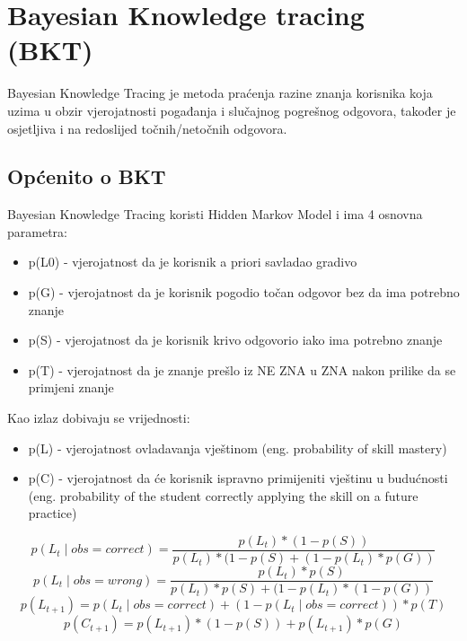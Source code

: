 \chapter{Bayesian Knowledge tracing (BKT)}
\label{ch:BKT}
Bayesian Knowledge Tracing je metoda praćenja razine znanja korisnika koja uzima u obzir vjerojatnosti pogađanja i slučajnog pogrešnog odgovora, također je osjetljiva i na redoslijed točnih/netočnih odgovora.
\section{Općenito o BKT}
Bayesian Knowledge Tracing koristi Hidden Markov Model i ima 4 osnovna parametra:
\begin{itemize}
	\item p(L0) - vjerojatnost da je korisnik a priori savladao gradivo
	\item p(G) - vjerojatnost da je korisnik pogodio točan odgovor bez da ima potrebno znanje	
	\item p(S) - vjerojatnost da je korisnik krivo odgovorio iako ima potrebno znanje	
	\item p(T) - vjerojatnost da je znanje prešlo iz NE ZNA u ZNA nakon prilike da se primjeni znanje
\end{itemize}
Kao izlaz dobivaju se vrijednosti:
\begin{itemize}
	\item p(L) - vjerojatnost ovladavanja vještinom (eng. probability of skill mastery)
	\item p(C) - vjerojatnost da će korisnik ispravno primijeniti vještinu u budućnosti (eng. probability of the student correctly applying the skill on a future practice)\newline
\end{itemize}

\begin{equation}
 p(L_t\mid obs=correct)=\frac{p(L_t)*(1-p(S))}{p(L_t)*(1-p(S)+(1-p(L_t)*p(G))}
\end{equation}\newline
\begin{equation}
 p(L_t\mid obs=wrong)=\frac{p(L_t)*p(S)}{p(L_t)*p(S)+(1-p(L_t)*(1-p(G))}
\end{equation}\newline
\begin{equation}
 p(L_{t+1})=p(L_t\mid obs=correct) + (1-p(L_t\mid obs=correct))*p(T)
\end{equation}\newline
\begin{equation}
 p(C_{t+1})=p(L_{t+1}) * (1-p(S)) + p(L_{t+1})*p(G)
\end{equation}

